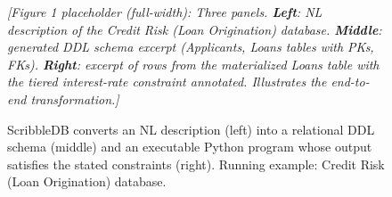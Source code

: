 \begin{figure}[t]
  \centering
  \vspace{2cm}
  \textit{[Figure 1 placeholder (full-width): Three panels.
  \textbf{Left}: NL description of the Credit Risk (Loan Origination) database.
  \textbf{Middle}: generated DDL schema excerpt (Applicants, Loans tables with PKs, FKs).
  \textbf{Right}: excerpt of rows from the materialized Loans table with the tiered
  interest-rate constraint annotated.
  Illustrates the end-to-end transformation.]}
  \vspace{2cm}
  \caption{ScribbleDB converts an NL description (left) into a relational DDL schema (middle)
           and an executable Python program whose output satisfies the stated constraints (right).
           Running example: Credit Risk (Loan Origination) database.}
  \label{fig:motivating}
\end{figure}